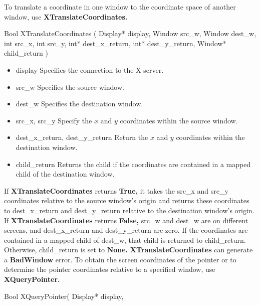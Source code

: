 \documentclass{report}
\begin{document}
\begin{itemize}
            \bigbreak \noindent 
            To translate a coordinate in one window to the coordinate space of another window, use \textbf{XTranslateCoordinates.}
            \bigbreak \noindent 
            \begin{cppcode}
                Bool XTranslateCoordinates (
                    Display* display,
                    Window src_w, Window dest_w,
                    int src_x, int src_y,
                    int* dest_x_return, int* dest_y_return,
                    Window* child_return
            )
            \end{cppcode}
            \bigbreak \noindent
            \begin{itemize}
                \item display Specifies the connection to the X server.
                \item src\_w Specifies the source window.
                \item dest\_w Specifies the destination window.
                \item src\_x, src\_y Specify the $x$ and $y$ coordinates within the source window.
                \item dest\_x\_return, dest\_y\_return Return the $x$ and $y$ coordinates within the destination window.
                \item child\_return Returns the child if the coordinates are contained in a mapped child of the destination window.
            \end{itemize}
            If \textbf{XTranslateCoordinates} returns \textbf{True,} it takes the src\_x and src\_y coordinates relative to the source window’s origin and returns these coordinates to dest\_x\_return and dest\_y\_return relative to the destination window’s origin. If \textbf{XTranslateCoordinates} returns \textbf{False,} src\_w and dest\_w are on different screens, and dest\_x\_return and dest\_y\_return are zero. If the coordinates are contained in a mapped child of dest\_w, that child is returned to child\_return. Otherwise, child\_return is set to \textbf{None.}
            \bigbreak \noindent 
            \textbf{XTranslateCoordinates} can generate a \textbf{BadWindow} error.
            \bigbreak \noindent 
            To obtain the screen coordinates of the pointer or to determine the pointer coordinates relative to a specified window, use \textbf{XQueryPointer.}
            \bigbreak \noindent 
            \begin{cppcode}
                Bool XQueryPointer(
                    Display* display,

\end{cppcode}
\end{itemize}
\end{document}
